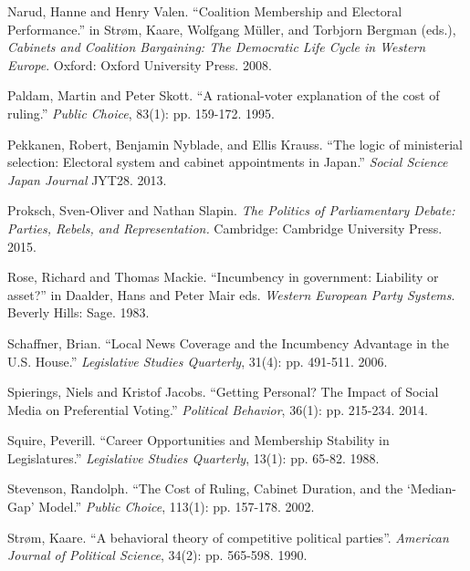 \documentclass[letter,12pt]{article}
\begin{document}
\begin{hangparas}{.25in}{1}
Narud, Hanne and Henry Valen. ``Coalition Membership and Electoral Performance.'' in Str{\o}m, Kaare, Wolfgang M{\"u}ller, and Torbjorn Bergman (eds.), \textit{Cabinets and Coalition Bargaining: The Democratic Life Cycle in Western Europe}. Oxford: Oxford University Press. 2008.

Paldam, Martin and Peter Skott. ``A rational-voter explanation of the cost of ruling.'' \textit{Public Choice}, 83(1): pp. 159-172. 1995.

Pekkanen, Robert, Benjamin Nyblade, and Ellis Krauss. ``The logic of ministerial selection: Electoral system and cabinet appointments in Japan.'' \textit{Social Science Japan Journal} JYT28. 2013.

Proksch, Sven-Oliver and Nathan Slapin. \textit{The Politics of Parliamentary Debate: Parties, Rebels, and Representation.} Cambridge: Cambridge University Press. 2015.

Rose, Richard and Thomas Mackie. ``Incumbency in government: Liability or asset?'' in Daalder, Hans and Peter Mair eds. \textit{Western European Party Systems}. Beverly Hills: Sage. 1983.

Schaffner, Brian. ``Local News Coverage and the Incumbency Advantage in the U.S. House.'' \textit{Legislative Studies Quarterly}, 31(4): pp. 491-511. 2006.

Spierings, Niels and Kristof Jacobs. ``Getting Personal? The Impact of Social Media on Preferential Voting.'' \textit{Political Behavior}, 36(1): pp. 215-234. 2014.

Squire, Peverill. ``Career Opportunities and Membership Stability in Legislatures.'' \textit{Legislative Studies Quarterly}, 13(1): pp. 65-82. 1988.

Stevenson, Randolph. ``The Cost of Ruling, Cabinet Duration, and the `Median-Gap' Model.'' \textit{Public Choice}, 113(1): pp. 157-178. 2002.

Str{\o}m, Kaare. ``A behavioral theory of competitive political parties''. \textit{American Journal of Political Science}, 34(2): pp. 565-598. 1990.
\end{hangparas}
\end{document}
